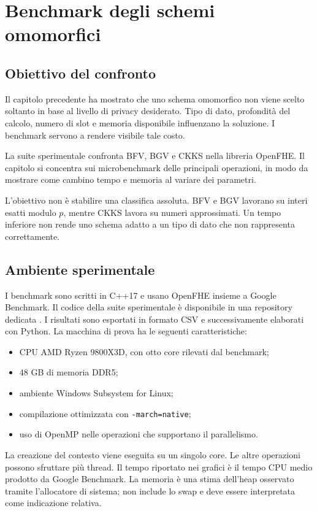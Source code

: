 \chapter{Benchmark degli schemi omomorfici}

\section{Obiettivo del confronto}
Il capitolo precedente ha mostrato che uno schema omomorfico non viene scelto soltanto in base al livello di privacy desiderato. Tipo di dato, profondit\`a del calcolo, numero di slot e memoria disponibile influenzano la soluzione. I benchmark servono a rendere visibile tale costo.

La suite sperimentale confronta BFV, BGV e CKKS nella libreria OpenFHE. Il capitolo si concentra sui microbenchmark delle principali operazioni, in modo da mostrare come cambino tempo e memoria al variare dei parametri.

L'obiettivo non \`e stabilire una classifica assoluta. BFV e BGV lavorano su interi esatti modulo $p$, mentre CKKS lavora su numeri approssimati. Un tempo inferiore non rende uno schema adatto a un tipo di dato che non rappresenta correttamente.

\section{Ambiente sperimentale}
I benchmark sono scritti in C++17 e usano OpenFHE insieme a Google Benchmark. Il codice della suite sperimentale \`e disponibile in una repository dedicata \cite{benchrepo}. I risultati sono esportati in formato CSV e successivamente elaborati con Python. La macchina di prova ha le seguenti caratteristiche:
\begin{itemize}
  \item CPU AMD Ryzen 9800X3D, con otto core rilevati dal benchmark;
  \item 48 GB di memoria DDR5;
  \item ambiente Windows Subsystem for Linux;
  \item compilazione ottimizzata con \texttt{-march=native};
  \item uso di OpenMP nelle operazioni che supportano il parallelismo.
\end{itemize}

La creazione del contesto viene eseguita su un singolo core. Le altre operazioni possono sfruttare pi\`u thread. Il tempo riportato nei grafici \`e il tempo CPU medio prodotto da Google Benchmark. La memoria \`e una stima dell'heap osservato tramite l'allocatore di sistema; non include lo swap e deve essere interpretata come indicazione relativa.

